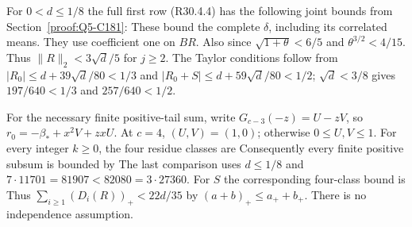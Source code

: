 For $0<d\le1/8$ the full first row (R30.4.4) has the following
joint bounds from Section~\ref{proof:Q5-C181}:
These bound the complete $\delta$, including its correlated means.
They use coefficient one on $BR$. Also
since $\sqrt{1+\theta}<6/5$ and $\theta^{3/2}<4/15$.
Thus $\|R\|_2<3\sqrt d/5$ for $j\ge2$.
The Taylor conditions follow from
$|R_0|\le d+39\sqrt d/80<1/3$ and
$|R_0+S|\le d+59\sqrt d/80<1/2$;
$\sqrt d<3/8$ gives $197/640<1/3$ and $257/640<1/2$.

For the necessary finite positive-tail sum, write
$G_{c-3}(-z)=U-zV$, so $r_0=-\beta_*+x^2V+zxU$.
At $c=4$, $(U,V)=(1,0)$; otherwise $0\le U,V\le1$.
For every integer $k\ge0$, the four residue classes are
Consequently every finite positive subsum is bounded by
The last comparison uses $d\le1/8$ and
$7\cdot11701=81907<82080=3\cdot27360$.
For $S$ the corresponding four-class bound is
Thus $\sum_{i\ge1}(D_i(R))_+<22d/35$ by
$(a+b)_+\le a_++b_+$. There is no independence assumption.

